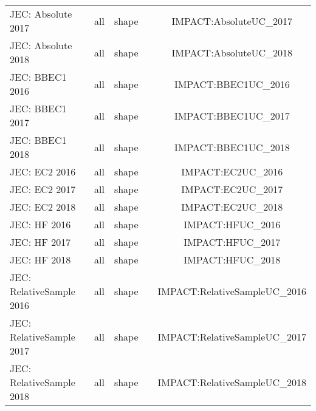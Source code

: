 \begin{table}
\begin{tabular}{l|c|c|c|c}
      JEC: Absolute             2017                      & all                   & shape             &                     & IMPACT:AbsoluteUC_2017  \\
      JEC: Absolute             2018                      & all                   & shape             &                     & IMPACT:AbsoluteUC_2018  \\
      JEC: BBEC1                2016                      & all                   & shape             &                     & IMPACT:BBEC1UC_2016  \\
      JEC: BBEC1                2017                      & all                   & shape             &                     & IMPACT:BBEC1UC_2017  \\
      JEC: BBEC1                2018                      & all                   & shape             &                     & IMPACT:BBEC1UC_2018  \\
      JEC: EC2                  2016                      & all                   & shape             &                     & IMPACT:EC2UC_2016  \\
      JEC: EC2                  2017                      & all                   & shape             &                     & IMPACT:EC2UC_2017  \\
      JEC: EC2                  2018                      & all                   & shape             &                     & IMPACT:EC2UC_2018  \\
      JEC: HF                   2016                      & all                   & shape             &                     & IMPACT:HFUC_2016  \\
      JEC: HF                   2017                      & all                   & shape             &                     & IMPACT:HFUC_2017  \\
      JEC: HF                   2018                      & all                   & shape             &                     & IMPACT:HFUC_2018  \\
      JEC: RelativeSample       2016                      & all                   & shape             &                     & IMPACT:RelativeSampleUC_2016  \\
      JEC: RelativeSample       2017                      & all                   & shape             &                     & IMPACT:RelativeSampleUC_2017  \\
      JEC: RelativeSample       2018                      & all                   & shape             &                     & IMPACT:RelativeSampleUC_2018  \\

\end{tabular}
\end{table}
